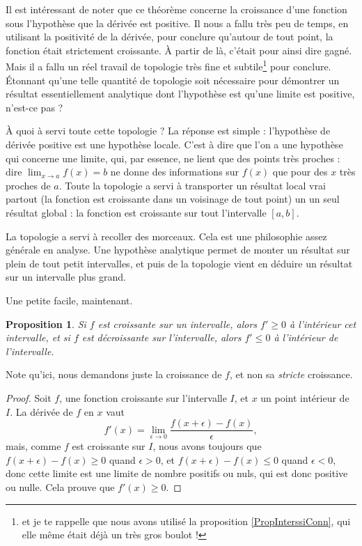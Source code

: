 \documentclass[a4paper,12pt]{book}
\newcounter{numtho}
\theoremstyle{mes_exemples}	\newtheorem{exemple}[numtho]{Exemple}
\theoremstyle{mes_tho}
\newtheorem{proposition}[numtho]{Proposition}
\begin{document}
Il est intéressant de noter que ce théorème concerne la croissance d'une fonction sous l'hypothèse que la dérivée est positive. Il nous a fallu très peu de temps, en utilisant la positivité de la dérivée, pour conclure qu'autour de tout point, la fonction était strictement croissante. À partir de là, c'était pour ainsi dire gagné. Mais il a fallu un réel travail de topologie très fine et subtile\footnote{et je te rappelle que nous avons utilisé la proposition \ref{PropInterssiConn}, qui elle même était déjà un très gros boulot !} pour conclure. Étonnant qu'une telle quantité de topologie soit nécessaire pour démontrer un résultat essentiellement analytique dont l'hypothèse est qu'une limite est positive, n'est-ce pas ? 

À quoi à servi toute cette topologie ? La réponse est simple : l'hypothèse de dérivée positive est une hypothèse locale. C'est à dire que l'on a une hypothèse qui concerne une limite, qui, par essence, ne lient que des points très proches : dire \og $\lim_{x\to a}f(x)=b$\fg{}  ne donne des informations sur $f(x)$ que pour des $x$ très proches de $a$. Toute la topologie a servi à transporter un résultat local vrai partout (la fonction est croissante dans un voisinage de tout point) un un seul résultat global : la fonction est croissante sur tout l'intervalle $[a,b]$.

La topologie a servi à recoller des morceaux. Cela est une philosophie assez générale en analyse. Une hypothèse analytique permet de monter un résultat sur plein de tout petit intervalles, et puis de la topologie vient en déduire un résultat sur un intervalle plus grand.

Une petite facile, maintenant.

\begin{proposition}
	Si $f$ est croissante sur un intervalle, alors $f'\geq 0$ à l'intérieur cet intervalle, et si $f$ est décroissante sur l'intervalle, alors $f'\leq 0$ à l'intérieur de l'intervalle.
\end{proposition}

Note qu'ici, nous demandons juste la croissance de $f$, et non sa \emph{stricte} croissance.

\begin{proof}
	Soit $f$, une fonction croissante sur l'intervalle $I$, et $x$ un point intérieur de $I$. La dérivée de $f$ en $x$ vaut
	\begin{equation}
		f'(x)=\lim_{\epsilon\to 0}\frac{ f(x+\epsilon)-f(x) }{\epsilon},
	\end{equation}
	mais, comme $f$ est croissante sur $I$, nous avons toujours que $f(x+\epsilon)-f(x)\geq0$ quand $\epsilon>0$, et $f(x+\epsilon)-f(x)\leq0$ quand $\epsilon<0$, donc cette limite est une limite de nombre positifs ou nuls, qui est donc positive ou nulle. Cela prouve que $f'(x)\geq 0$.
\end{proof}
\end{document}

